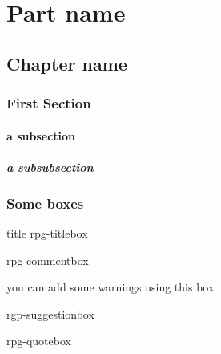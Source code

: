 \documentclass[10pt,a4paper,openany]{book}
\begin{document}
\selectfont %
\frontmatter

\rpgMakeCover[
    image = img/cover,
    logo = img/logo,
    title = Rpg Template,
    subtitle = Created by Krozark the \today\\with XeTeX\\\url{https://github.com/Krozark/RPG-LaTeX-Template}
]


\tableofcontents

\mainmatter
\part{Part name}
\chapter{Chapter name}

\section{First Section}
\lipsum[2]

\subsection{a subsection}
\lipsum[1]
\subsubsection{a subsubsection}
\lipsum[1]


\section{Some boxes}
\begin{rpg-titlebox}{title}
	rpg-titlebox
\end{rpg-titlebox}

\begin{rpg-commentbox}
	rpg-commentbox
\end{rpg-commentbox}

\begin{rpg-warnbox}
	you can add some warnings using this box
\end{rpg-warnbox}

\begin{rpg-suggestionbox}
	rgp-suggestionbox
\end{rpg-suggestionbox}

\begin{rpg-quotebox}
    rpg-quotebox
\end{rpg-quotebox}
\end{document}
